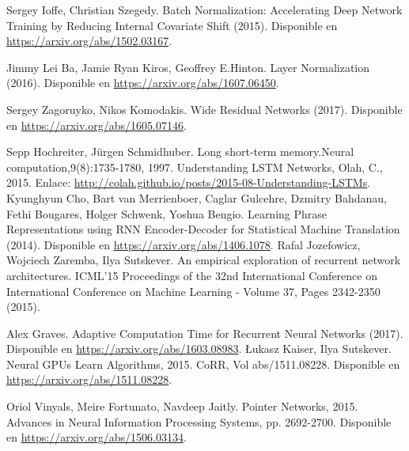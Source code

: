 \documentclass[conference]{IEEEtran}
\begin{document}
\begin{thebibliography}{00}
Sergey Ioffe, Christian Szegedy. Batch Normalization: Accelerating Deep Network Training by Reducing Internal Covariate Shift (2015). Disponible en \href{https://arxiv.org/abs/1502.03167}{https://arxiv.org/abs/1502.03167}.

 Jimmy Lei Ba, Jamie Ryan Kiros, Geoffrey E.Hinton. Layer Normalization (2016). Disponible en \href{https://arxiv.org/abs/1607.06450}{https://arxiv.org/abs/1607.06450}.

Sergey Zagoruyko, Nikos Komodakis. Wide Residual Networks (2017). Disponible en \href{https://arxiv.org/abs/1605.07146}{https://arxiv.org/abs/1605.07146}.

 Sepp Hochreiter, J\"urgen Schmidhuber.  Long short-term memory.Neural computation,9(8):1735-1780, 1997.
Understanding LSTM Networks, Olah, C., 2015. Enlace: \href{http://colah.github.io/posts/2015-08-Understanding-LSTMs}{http://colah.github.io/posts/2015-08-Understanding-LSTMs}.
 Kyunghyun Cho, Bart van Merrienboer, Caglar Gulcehre, Dzmitry Bahdanau, Fethi Bougares, Holger Schwenk, Yoshua Bengio.  Learning Phrase Representations using RNN Encoder-Decoder for Statistical Machine Translation (2014). Disponible en \href{https://arxiv.org/abs/1406.1078}{https://arxiv.org/abs/1406.1078}.
 Rafal Jozefowicz, Wojciech Zaremba, Ilya Sutskever. An empirical exploration of recurrent network architectures. ICML'15 Proceedings of the 32nd International Conference on International Conference on Machine Learning - Volume 37, Pages 2342-2350 (2015). 

Alex Graves. Adaptive Computation Time for Recurrent Neural Networks (2017). Disponible en \href{https://arxiv.org/abs/1603.08983}{https://arxiv.org/abs/1603.08983}.
Łukasz Kaiser, Ilya Sutskever. Neural GPUs Learn Algorithms, 2015. CoRR, Vol abs/1511.08228. Disponible en \href{https://arxiv.org/abs/1511.08228}{https://arxiv.org/abs/1511.08228}.

Oriol Vinyals, Meire Fortunato, Navdeep Jaitly. Pointer Networks, 2015. Advances in Neural Information Processing Systems, pp. 2692-2700. Disponible en \href{https://arxiv.org/abs/1506.03134}{https://arxiv.org/abs/1506.03134}.


\end{thebibliography}
\end{document}
